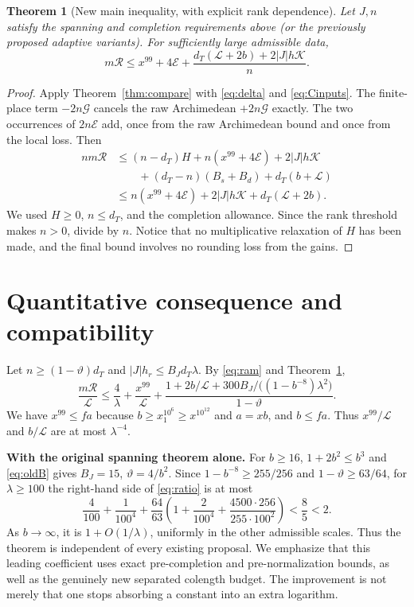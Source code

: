 \documentclass[11pt,letterpaper]{article}
\newtheorem{theorem}{Theorem}[section]
\theoremstyle{remark}\newtheorem{remark}[theorem]{Remark}
\newcommand{\R}{\mathcal R}\newcommand{\E}{\mathcal E}\newcommand{\Lfour}{\mathcal L}\newcommand{\K}{\mathcal K}\newcommand{\G}{\mathcal G}\newcommand{\Gr}{\operatorname{Gram}}\newcommand{\rk}{\operatorname{rank}}\newcommand{\Height}{\operatorname{HeightLe}}
\begin{document}
\begin{theorem}[New main inequality, with explicit rank dependence]\label{thm:main}
Let $J,n$ satisfy the spanning and completion requirements above (or the previously proposed adaptive variants). For sufficiently large admissible data,
\begin{equation}\label{eq:main}
 m\R\le x^{99}+4\E+\frac{d_T(\Lfour+2b)+2|J|h\K}{n}.
\end{equation}
\end{theorem}
\begin{proof}
Apply Theorem~\ref{thm:compare} with \eqref{eq:delta} and \eqref{eq:Cinputs}. The finite-place term $-2n\G$ cancels the raw Archimedean $+2n\G$ exactly. The two occurrences of $2n\E$ add, once from the raw Archimedean bound and once from the local loss. Then
\begin{align*}
 n m\R&\le (n-d_T)H+n(x^{99}+4\E)+2|J|h\K\\
 &\qquad+(d_T-n)(B_s+B_d)+d_T(b+\Lfour)\\
 &\le n(x^{99}+4\E)+2|J|h\K+d_T(\Lfour+2b).
\end{align*}
We used $H\ge0$, $n\le d_T$, and the completion allowance. Since the rank threshold makes $n>0$, divide by $n$. Notice that no multiplicative relaxation of $H$ has been made, and the final bound involves no rounding loss from the gains.
\end{proof}

\section{Quantitative consequence and compatibility}\label{sec:constants}
Let $n\ge(1-\vartheta)d_T$ and $|J|h_r\le B_J d_T\lambda$. By \eqref{eq:ram} and Theorem~\ref{thm:main},
\begin{equation}\label{eq:ratio}
 \frac{m\R}{\Lfour}\le
 \frac{4}{\lambda}+\frac{x^{99}}{\Lfour}+
 \frac{1+2b/\Lfour+300B_J/\bigl((1-b^{-8})\lambda^2\bigr)}{1-\vartheta}.
\end{equation}
We have $x^{99}\le fa$ because $b\ge x_1^{10^6}\ge x^{10^{12}}$ and $a=xb$, and $b\le fa$. Thus $x^{99}/\Lfour$ and $b/\Lfour$ are at most $\lambda^{-4}$.

\textbf{With the original spanning theorem alone.} For $b\ge16$, $1+2b^2\le b^3$ and \eqref{eq:oldB} gives $B_J=15$, $\vartheta=4/b^2$. Since $1-b^{-8}\ge255/256$ and $1-\vartheta\ge63/64$, for $\lambda\ge100$ the right-hand side of \eqref{eq:ratio} is at most
\[
 \frac4{100}+\frac1{100^4}+\frac{64}{63}
 \left(1+\frac2{100^4}+\frac{4500\cdot256}{255\cdot100^2}\right)<\frac85<2.
\]
As $b\to\infty$, it is $1+O(1/\lambda)$, uniformly in the other admissible scales. Thus the theorem is independent of every existing proposal. We emphasize that this leading coefficient uses exact pre-completion and pre-normalization bounds, as well as the genuinely new separated colength budget. The improvement is not merely that one stops absorbing a constant into an extra logarithm.
\end{document}
